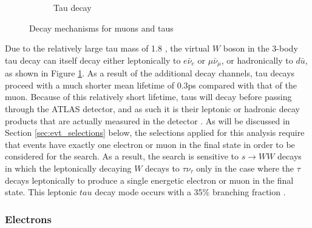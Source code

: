 \begin{figure}[hp]
\begin{subfigure}[t]{0.49\textwidth}
%
%				
%				
%
	\caption{Tau decay}
	\label{fig:tau_decay}
	\end{subfigure}
	\caption{Decay mechanisms for muons and taus}
	\label{fig:lepton_decays}
\end{figure}

Due to the relatively large tau mass of 1.8 \GeV, the virtual \(W\) boson in the 3-body tau decay can itself decay either leptonically to \(e\bar{\nu}_e\) or \(\mu\bar{\nu}_\mu\), or hadronically to \(d\bar{u}\), as shown in Figure \ref{fig:tau_decay}. As a result of the additional decay channels, tau decays proceed with a much shorter mean lifetime of 0.3ps compared with that of the muon. Because of this relatively short lifetime, taus will decay before passing through the ATLAS detector, and as such it is their leptonic or hadronic decay products that are actually measured in the detector \cite{ATLAS-CONF-2017-029}. As will be discussed in Section \ref{sec:evt_selections} below, the selections applied for this analysis require that events have exactly one electron or muon in the final state in order to be considered for the search. As a result, the search is sensitive to \(s\rightarrow WW\) decays in which the leptonically decaying \(W\) decays to \(\tau\nu_\tau\) only in the case where the \(\tau\) decays leptonically to produce a single energetic electron or muon in the final state. This leptonic \(tau\) decay mode occurs with a 35\% branching fraction \cite{ATLAS-CONF-2017-029}.

\subsubsection{Electrons}

